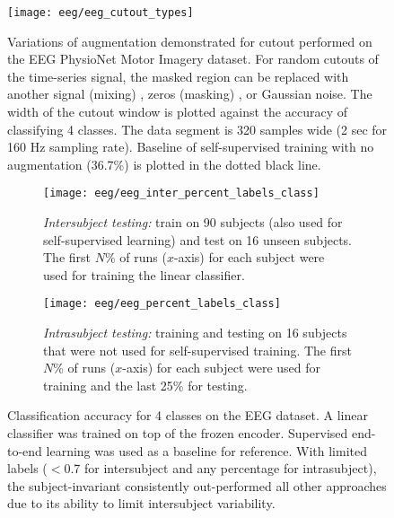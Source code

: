 \documentclass{article}
\begin{document}
\begin{figure}[H]
  \centering
  \texttt{[image: eeg/eeg\_cutout\_types]}
  \caption{Variations of augmentation demonstrated for cutout performed on the
  EEG PhysioNet Motor Imagery dataset. For random cutouts of the time-series
  signal, the masked region can be replaced with another signal (mixing)
  \cite{yun_cutmix_2019}, zeros (masking) \cite{devries_improved_2017}, or
  Gaussian noise. The width of the cutout window is plotted against the accuracy
  of classifying 4 classes. The data segment is 320 samples wide (2 sec for 160
  Hz sampling rate). Baseline of self-supervised training with no augmentation
  (36.7\%) is plotted in the dotted black line. }
  \label{fig:eeg:aug:cutout}
\end{figure}

\begin{figure}[H]
  \centering
  \begin{subfigure}[t]{0.49\textwidth}
    \texttt{[image: eeg/eeg\_inter\_percent\_labels\_class]}
    \caption{\textit{Intersubject testing:} train on 90 subjects (also used for
    self-supervised learning) and test on 16 unseen subjects. The first $N$\% of
    runs ($x$-axis) for each subject were used for training the linear
    classifier.}
  \end{subfigure}
  \hfill
  \begin{subfigure}[t]{0.49\textwidth}
    \texttt{[image: eeg/eeg\_percent\_labels\_class]}
    \caption{\textit{Intrasubject testing:} training and testing on 16 subjects
    that were not used for self-supervised training. The first $N$\% of runs
    ($x$-axis) for each subject were used for training and the last 25\% for testing.}
  \end{subfigure}
  \caption{Classification accuracy for 4 classes on the EEG dataset. A linear
  classifier was trained on top of the frozen encoder. Supervised end-to-end
  learning was used as a baseline for reference. With limited labels ($<$0.7 for
  intersubject and any percentage for intrasubject), the subject-invariant
  consistently out-performed all other approaches due to its ability to limit
  intersubject variability.}
  \label{fig:eeg:labels:supp}
\end{figure}
\end{document}
